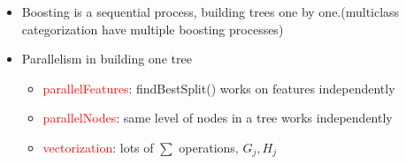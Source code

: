 \documentclass{beamer}
\begin{document}
\begin{frame}
\begin{columns}[c]
		\begin{itemize}
			\item Boosting is a sequential process, building trees one by one.(multiclass categorization have multiple boosting processes)
			\item Parallelism in building one tree
			\begin{itemize}			
				\item \textcolor{red}{parallelFeatures}: findBestSplit() works on features independently
				\item \textcolor{red}{parallelNodes}: same level of nodes in a tree works independently
				\item \textcolor{red}{vectorization}: lots of $\sum$ operations, $G_j, H_j$
			\end{itemize}			
			
		\end{itemize}
	\end{columns}	
	
\end{frame}
\end{document}
